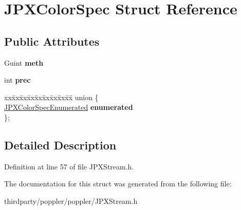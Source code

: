 \hypertarget{struct_j_p_x_color_spec}{}\section{J\+P\+X\+Color\+Spec Struct Reference}
\label{struct_j_p_x_color_spec}
\subsection*{Public Attributes}
\begin{DoxyCompactItemize}
\item 
\mbox{\label{struct_j_p_x_color_spec_a17b596ca13ac91f90f3bab522e4e0121}} 
Guint {\bfseries meth}
\item 
\mbox{\label{struct_j_p_x_color_spec_a185cc10a137e19a8d20070403701bc83}} 
int {\bfseries prec}
\item 
\mbox{\label{struct_j_p_x_color_spec_a20fde6ad50d518a40f2fe2417215c62c}} 
\begin{tabbing}
xx\=xx\=xx\=xx\=xx\=xx\=xx\=xx\=xx\=\kill
union \{\\
\>\hyperlink{struct_j_p_x_color_spec_enumerated}{JPXColorSpecEnumerated} {\bfseries enumerated}\\
\}; \\

\end{tabbing}\end{DoxyCompactItemize}


\subsection{Detailed Description}


Definition at line 57 of file J\+P\+X\+Stream.\+h.



The documentation for this struct was generated from the following file\+:\begin{DoxyCompactItemize}
\item 
thirdparty/poppler/poppler/J\+P\+X\+Stream.\+h\end{DoxyCompactItemize}
